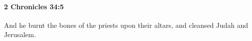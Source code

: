 
		\paragraph{2 Chronicles 34:5} %
			\label{2CHRONICLES-34-5}

			And he burnt the bones of the priests upon their altars, and cleansed Judah and Jerusalem.


